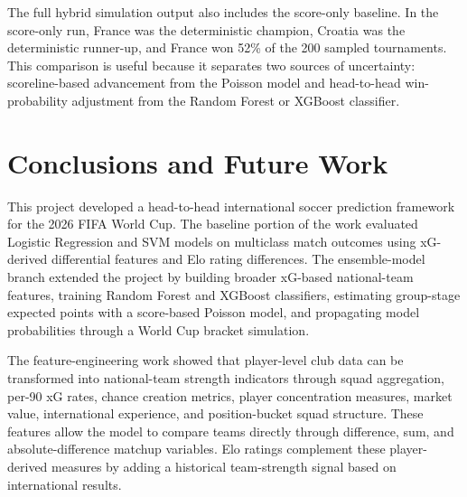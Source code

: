 \documentclass[11pt]{article}
\begin{document}
The full hybrid simulation output also includes the score-only baseline. In the score-only run, France was the deterministic champion, Croatia was the deterministic runner-up, and France won 52\% of the 200 sampled tournaments. This comparison is useful because it separates two sources of uncertainty: scoreline-based advancement from the Poisson model and head-to-head win-probability adjustment from the Random Forest or XGBoost classifier.

\begin{table}[h!]
\centering
\small
{}
\caption{Comparison of tournament simulation outputs across the score-only baseline and the two hybrid winner-model workflows.}
\label{tab:hybrid_simulation_comparison}
\end{table}

\section{Conclusions and Future Work}

This project developed a head-to-head international soccer prediction framework for the 2026 FIFA World Cup. The baseline portion of the work evaluated Logistic Regression and SVM models on multiclass match outcomes using xG-derived differential features and Elo rating differences. The ensemble-model branch extended the project by building broader xG-based national-team features, training Random Forest and XGBoost classifiers, estimating group-stage expected points with a score-based Poisson model, and propagating model probabilities through a World Cup bracket simulation.

The feature-engineering work showed that player-level club data can be transformed into national-team strength indicators through squad aggregation, per-90 xG rates, chance creation metrics, player concentration measures, market value, international experience, and position-bucket squad structure. These features allow the model to compare teams directly through difference, sum, and absolute-difference matchup variables. Elo ratings complement these player-derived measures by adding a historical team-strength signal based on international results.
\end{document}

